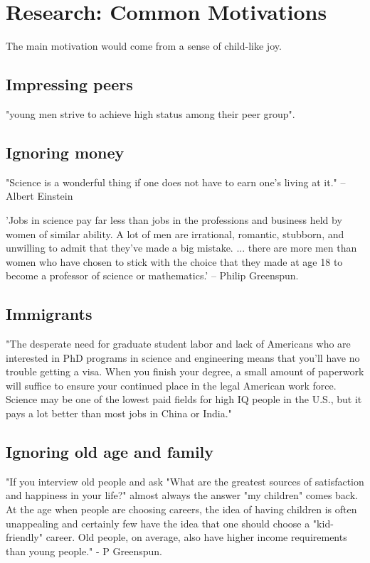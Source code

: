 \documentclass[oneside, article]{memoir}
\begin{document}
\section{Research: Common Motivations}
The main motivation would come from a sense of child-like joy.

\subsection{Impressing peers}
"young men strive to achieve high status among their peer group". 

\subsection{Ignoring money}
"Science is a wonderful thing if one does not have to earn one's living at it." -- Albert Einstein 

'Jobs in science pay far less than jobs in the professions and business held by women of similar ability. A lot of men are irrational, romantic, stubborn, and unwilling to admit that they've made a big mistake. ... there are more men than women who have chosen to stick with the choice that they made at age 18 to become a professor of science or mathematics.' -- Philip Greenspun.

\subsection{Immigrants}
"The desperate need for graduate student labor and lack of Americans who are interested in PhD programs in science and engineering means that you'll have no trouble getting a visa. When you finish your degree, a small amount of paperwork will suffice to ensure your continued place in the legal American work force. Science may be one of the lowest paid fields for high IQ people in the U.S., but it pays a lot better than most jobs in China or India."

\subsection{Ignoring old age and family}
"If you interview old people and ask "What are the greatest sources of satisfaction and happiness in your life?" almost always the answer "my children" comes back. At the age when people are choosing careers, the idea of having children is often unappealing and certainly few have the idea that one should choose a "kid-friendly" career. Old people, on average, also have higher income requirements than young people." - P Greenspun.
\end{document}
